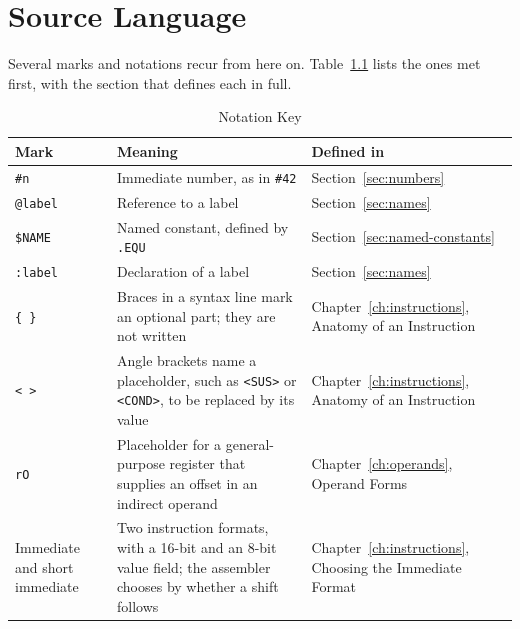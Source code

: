 \chapter{Source Language}
\label{ch:source-language}

Several marks and notations recur from here on. Table~\ref{tab:notation-key} lists the ones met first, with the section
that defines each in full.

\begin{table}[H]
	\centering
	\begin{tabularx}{\textwidth}{@{}p{2.6cm} X p{4.2cm}@{}}
		\toprule
		\textbf{Mark}                 & \textbf{Meaning}                                                                                                  & \textbf{Defined in}                                          \\
		\midrule
		\texttt{\#n}                  & Immediate number, as in \texttt{\#42}                                                                             & Section~\ref{sec:numbers}                                    \\
		\texttt{@label}               & Reference to a label                                                                                              & Section~\ref{sec:names}                                      \\
		\texttt{\$NAME}               & Named constant, defined by \texttt{.EQU}                                                                          & Section~\ref{sec:named-constants}                            \\
		\texttt{:label}               & Declaration of a label                                                                                            & Section~\ref{sec:names}                                      \\
		\texttt{\{ \}}                & Braces in a syntax line mark an optional part; they are not written                                               & Chapter~\ref{ch:instructions}, Anatomy of an Instruction     \\
		\texttt{<\,>}                 & Angle brackets name a placeholder, such as \texttt{<SUS>} or \texttt{<COND>}, to be replaced by its value         & Chapter~\ref{ch:instructions}, Anatomy of an Instruction     \\
		\texttt{rO}                   & Placeholder for a general-purpose register that supplies an offset in an indirect operand                         & Chapter~\ref{ch:operands}, Operand Forms                     \\
		Immediate and short immediate & Two instruction formats, with a 16-bit and an 8-bit value field; the assembler chooses by whether a shift follows & Chapter~\ref{ch:instructions}, Choosing the Immediate Format \\
		\bottomrule
	\end{tabularx}
	\caption{Notation Key}
	\label{tab:notation-key}
\end{table}

